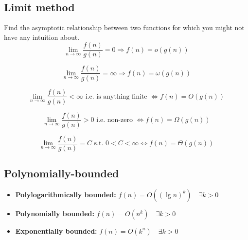\documentclass{article}
\begin{document}
\subsection{Limit method}
\begin{definition}
    Find the asymptotic relationship between two functions for which you might not have any intuition about. 
    \begin{equation}
        \lim_{n \to \infty} \frac{f(n)}{g(n)} = 0 \Rightarrow f(n) = o(g(n))
    \end{equation}
    
    \begin{equation}
        \lim_{n \to \infty} \frac{f(n)}{g(n)} = \infty \Rightarrow f(n) = \omega(g(n))
    \end{equation}
    
    \begin{equation}
        \lim_{n \to \infty} \frac{f(n)}{g(n)} < \infty \text{ i.e. is anything finite } \Leftrightarrow f(n) = O(g(n))
    \end{equation}
    
    \begin{equation}
        \lim_{n \to \infty} \frac{f(n)}{g(n)} > 0 \text{ i.e. non-zero } \Leftrightarrow f(n) = \Omega(g(n))
    \end{equation}
    
    \begin{equation}
        \lim_{n \to \infty} \frac{f(n)}{g(n)} = C \text{ s.t. } 0 < C < \infty \Leftrightarrow f(n) = \Theta(g(n))
    \end{equation}        
\end{definition}

\subsection{Polynomially-bounded}
\begin{definition}
    \begin{itemize}
        \item \textbf{Polylogarithmically bounded:} \( f(n) = O((\lg n)^k) \quad \exists k > 0 \)
        
        \item \textbf{Polynomially bounded:} \( f(n) = O(n^k) \quad \exists k > 0 \)
        
        \item \textbf{Exponentially bounded:} \( f(n) = O(k^n) \quad \exists k > 0 \)
    \end{itemize}
\end{definition}
\end{document}
